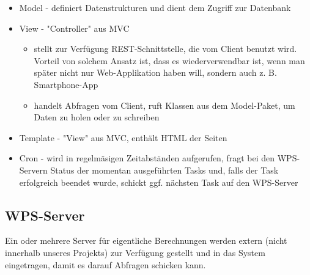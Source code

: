         \begin{itemize}
            \item Model - definiert Datenstrukturen und dient dem Zugriff zur Datenbank
            \item View - "Controller" aus MVC 
            
            \begin{itemize}
                \item stellt zur Verfügung REST-Schnittstelle, die vom Client benutzt wird. Vorteil von solchem Ansatz ist, dass es wiederverwendbar ist, wenn man später nicht nur Web-Applikation haben will, sondern auch z. B. Smartphone-App
                \item handelt Abfragen vom Client, ruft Klassen aus dem Model-Paket, um Daten zu holen oder zu schreiben
            \end{itemize}
            \item Template - "View" aus MVC, enthält HTML der Seiten 
            \item Cron - wird in regelmäsigen Zeitabständen aufgerufen, fragt bei den WPS-Servern Status der momentan ausgeführten Tasks und, falls der Task erfolgreich beendet wurde, schickt ggf. nächsten Task auf den WPS-Server
        \end{itemize}
        
        \subsection{WPS-Server}
        
        Ein oder mehrere Server für eigentliche Berechnungen werden extern (nicht innerhalb unseres Projekts) zur Verfügung gestellt und in das System eingetragen, damit es darauf Abfragen schicken kann.
    